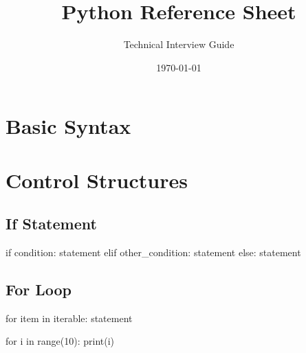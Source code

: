 \documentclass[11pt]{article}
\title{Python Reference Sheet}
\author{Technical Interview Guide}
\date{\today}
\begin{document}


\section{Basic Syntax}

\begin{multicols}{3}
  
\end{multicols}

\section{Control Structures}

\begin{multicols}{3}
  \subsection{If Statement}
  \begin{moderncode}
if condition:
    statement
elif other_condition:
    statement
else:
    statement
  \end{moderncode}
  
  \subsection{For Loop}
  \begin{moderncode}
for item in iterable:
    statement
    
for i in range(10):
    print(i)
  \end{moderncode}
\end{multicols}
\end{document}
